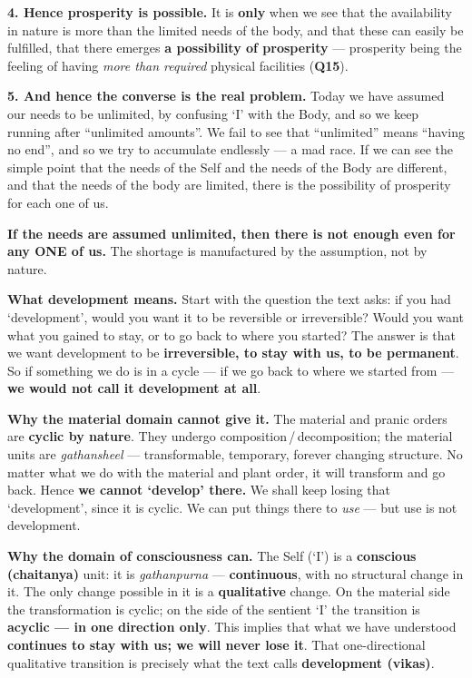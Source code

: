\textbf{4. Hence prosperity is possible.} It is \textbf{only} when we see that
the availability in nature is more than the limited needs of the body, and
that these can easily be fulfilled, that there emerges \textbf{a possibility
of prosperity} --- prosperity being the feeling of having \emph{more than
required} physical facilities (\textbf{Q15}).

\textbf{5. And hence the converse is the real problem.} Today we have assumed
our needs to be unlimited, by confusing `I' with the Body, and so we keep
running after ``unlimited amounts''. We fail to see that ``unlimited'' means
``having no end'', and so we try to accumulate endlessly --- a mad race. If we
can see the simple point that the needs of the Self and the needs of the Body
are different, and that the needs of the body are limited, there is the
possibility of prosperity for each one of us.

\begin{keybox}
\textbf{If the needs are assumed unlimited, then there is not enough even for
any ONE of us.} The shortage is manufactured by the assumption, not by nature.
\end{keybox}


\ans \textbf{What development means.} Start with the question the text asks:
if you had `development', would you want it to be reversible or irreversible?
Would you want what you gained to stay, or to go back to where you started?
The answer is that we want development to be \textbf{irreversible, to stay
with us, to be permanent}. So if something we do is in a cycle --- if we go
back to where we started from --- \textbf{we would not call it development at
all}.

\textbf{Why the material domain cannot give it.} The material and pranic
orders are \textbf{cyclic by nature}. They undergo
composition\,/\,decomposition; the material units are \emph{gathansheel} ---
transformable, temporary, forever changing structure. No matter what we do
with the material and plant order, it will transform and go back. Hence
\textbf{we cannot `develop' there.} We shall keep losing that `development',
since it is cyclic. We can put things there to \emph{use} --- but use is not
development.

\textbf{Why the domain of consciousness can.} The Self (`I') is a
\textbf{conscious (chaitanya)} unit: it is \emph{gathanpurna} ---
\textbf{continuous}, with no structural change in it. The only change possible
in it is a \textbf{qualitative} change. On the material side the transformation
is cyclic; on the side of the sentient `I' the transition is \textbf{acyclic
--- in one direction only}. This implies that what we have understood
\textbf{continues to stay with us; we will never lose it}. That one-directional
qualitative transition is precisely what the text calls \textbf{development
(vikas)}.

